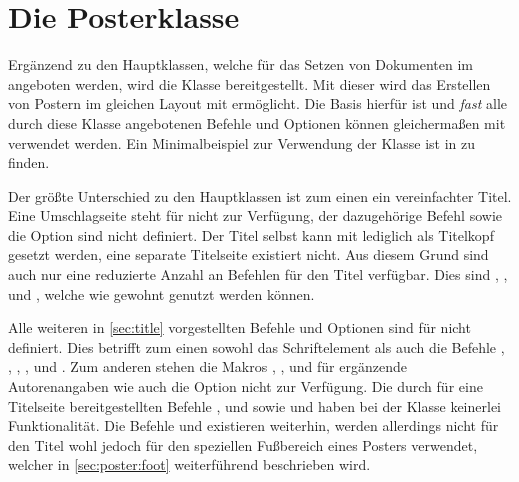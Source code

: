 \chapter[Die Posterklasse \Class*{tudscrposter}]{Die Posterklasse}
%
%
\begin{Bundle*}[v2.05]{}
%
\printchangedatlist%
%
Ergänzend zu den Hauptklassen, welche für das Setzen von Dokumenten im \TUDCD 
angeboten werden, wird die Klasse  bereitgestellt. Mit 
dieser wird das Erstellen von Postern im gleichen Layout mit  
ermöglicht. Die Basis hierfür ist  und \emph{fast} alle 
durch diese Klasse angebotenen Befehle und Optionen können gleichermaßen mit 
 verwendet werden. Ein Minimalbeispiel zur Verwendung der 
Klasse ist in  zu finden.

Der größte Unterschied zu den Hauptklassen ist zum einen ein vereinfachter 
Titel. Eine Umschlagseite steht für  nicht zur Verfügung, 
der dazugehörige Befehl  sowie die Option  
sind nicht definiert. Der Titel selbst kann mit  lediglich als 
Titelkopf gesetzt werden, eine separate Titelseite existiert nicht. Aus diesem 
Grund sind auch nur eine reduzierte Anzahl an Befehlen für den Titel verfügbar. 
Dies sind , ,  und 
, welche wie gewohnt genutzt werden können.

Alle weiteren in \autoref{sec:title} vorgestellten Befehle und Optionen sind 
für  nicht definiert. Dies betrifft zum einen sowohl das 
Schriftelement  als auch die Befehle , 
, , ,  und  
. Zum anderen stehen die Makros , 
,  und  
für ergänzende Autorenangaben wie auch die Option  nicht 
zur Verfügung. Die durch \KOMAScript{} für eine Titelseite bereitgestellten 
Befehle ,  und  sowie 
 und  haben bei der Klasse 
 keinerlei Funktionalität. Die Befehle  und 
 existieren weiterhin, werden allerdings nicht für den Titel 
wohl jedoch für den speziellen Fußbereich eines Posters verwendet, welcher in 
\autoref{sec:poster:foot} weiterführend beschrieben wird.


\end{Bundle*}
